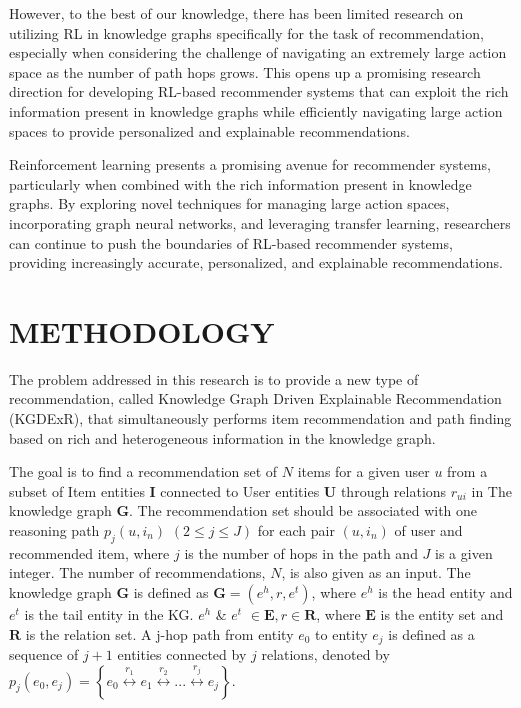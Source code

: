 \documentclass[11pt]{article}
\begin{document}
However, to the best of our knowledge, there has been limited research on utilizing RL in knowledge graphs specifically for the task of recommendation, especially when considering the challenge of navigating an extremely large action space as the number of path hops grows. This opens up a promising research direction for developing RL-based recommender systems that can exploit the rich information present in knowledge graphs while efficiently navigating large action spaces to provide personalized and explainable recommendations.

Reinforcement learning presents a promising avenue for recommender systems, particularly when combined with the rich information present in knowledge graphs. By exploring novel techniques for managing large action spaces, incorporating graph neural networks, and leveraging transfer learning, researchers can continue to push the boundaries of RL-based recommender systems, providing increasingly accurate, personalized, and explainable recommendations.

\section{METHODOLOGY} \label{sec_method}
The problem addressed in this research is to provide a new type of recommendation, called Knowledge Graph Driven Explainable Recommendation (KGDExR), that simultaneously performs item recommendation and path finding based on rich and heterogeneous information in the knowledge graph. 

The goal is to find a recommendation set of $N$ items for a given user $u$ from a subset of Item entities $\mathbf{I}$ connected to User entities $\mathbf{U}$ through relations $r_{ui}$ in The knowledge graph $\mathbf{G}$. The recommendation set should be associated with one reasoning path $p_{j}(u,i_{n})$ $(2 \leq j \leq J)$ for each pair $(u,i_{n})$ of user and recommended item, where $j$ is the number of hops in the path and $J$ is a given integer. The number of recommendations, $N$, is also given as an input.
The knowledge graph $\mathbf{G}$ is defined as $\mathbf{G} = (e^{h},r, e^{t})$, where $e^{h}$ is the head entity and $e^{t}$ is the tail entity in the KG. $e^{h}$ \& $e^{t}$ $\in \mathbf{E}, r \in \mathbf{R}$, where $\mathbf{E} $ is the entity set and $\mathbf{R}$ is the relation set. A j-hop path from entity $e_{0}$ to entity $e_{j}$ is defined as a sequence of $j+1$ entities connected by $j$ relations, denoted by $ p_{j}(e_{0},e_{j}) = \left \{ e_{0} \overset{r_{1}}{\leftrightarrow }   e_{1} \overset{r_{2}}{\leftrightarrow } . . . \overset{r_{j}}{\leftrightarrow } e_{j} \right \} $.
\end{document}

